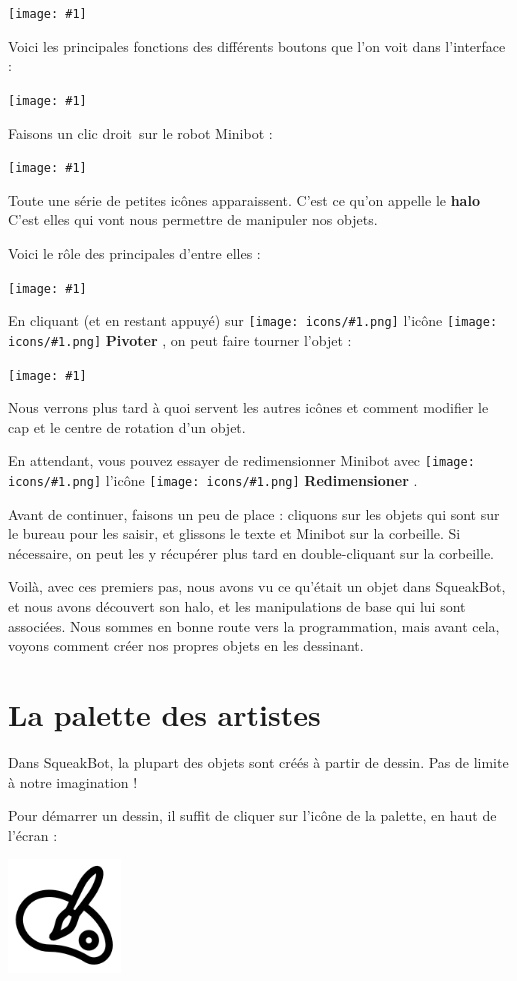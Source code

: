 \documentclass[a4paper,12pt]{book}
\def\appName{SqueakBot}
\def\cd{clic droit~}
\newcommand{\capture}[1]
{
\begin{center}
	\texttt{[image: \#1]}
\end{center}
}
\newcommand{\important}[1]{\textbf{#1}}
\newcommand{\motcle}[2]{\important{\gls{#1}}}
\newcommand{\inserticon}[1]
{
\texttt{[image: icons/\#1.png]}
}
\newcommand{\icon}[2][]
{
\ifthenelse {\equal{#1} {}} {\inserticon{#2}} {l'icône \inserticon{#2} \important{#1}}
}
\newcommand{\afaire}[1]
{
#1
}
\begin{document}
\capture{0.png}

Voici les principales fonctions des différents boutons que l'on voit dans l'interface :

\capture{2.png}

Faisons un \cd sur le robot Minibot :
\capture{1.png}

Toute une série de petites icônes apparaissent. C'est ce qu'on appelle le \motcle{halo}. C'est elles qui vont nous permettre de manipuler nos objets.

Voici le rôle des principales d'entre elles :

\capture{3.png}

En cliquant (et en restant appuyé) sur\icon[Pivoter]{pivoter}, on peut faire tourner l'objet :

\capture{4.png}

Nous verrons plus tard à quoi servent les autres icônes et comment modifier le cap et le centre de rotation d'un objet.

\afaire{
En attendant, vous pouvez essayer de redimensionner Minibot avec \icon[Redimensioner]{redimensionner}.
}

Avant de continuer, faisons un peu de place : cliquons sur les objets qui sont sur le bureau pour les saisir, et glissons le texte et Minibot sur la corbeille. Si nécessaire, on peut les y récupérer plus tard en double-cliquant sur la corbeille.

Voilà, avec ces premiers pas, nous avons vu ce qu'était un objet dans \appName, et nous avons découvert son halo, et les manipulations de base qui lui sont associées. Nous sommes en bonne route vers la programmation, mais avant cela, voyons comment créer nos propres objets en les dessinant.

\section{La palette des artistes}

Dans \appName, la plupart des objets sont créés à partir de dessin. Pas de limite à notre imagination !

Pour démarrer un dessin, il suffit de cliquer sur l'icône de la palette, en haut de l'écran :

\begin{center}
    \includegraphics[width=3cm]{palette.png}
\end{center}
\end{document}
